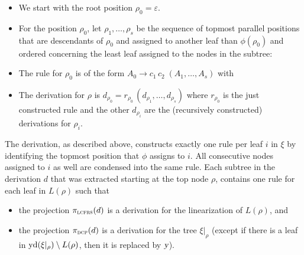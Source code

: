 \documentclass[../../document.tex]{subfiles}
\begin{document}
    \begin{itemize}
        \item We start with the root position \(\rho_0 = \varepsilon\).
        \item For the position \(\rho_0\), let \(\rho_1, \ldots, \rho_s\) be the sequence of topmost parallel positions that are descendants of \(\rho_0\) and assigned to another leaf than \(\phi(\rho_0)\) and ordered concerning the least leaf assigned to the nodes in the subtree:
        \item The rule for \(\rho_0\) is of the form \(A_0 \to c_1 \, c_2\; (A_1, \ldots, A_s)\) with
        \item The derivation for \(\rho\) is \(d_{\rho_0} = r_{\rho_0}\,(d_{\rho_1}, \ldots, d_{\rho_s})\) where \(r_{\rho_0}\) is the just constructed rule and the other \(d_{\rho_i}\) are the (recursively constructed) derivations for \(\rho_i\).
    \end{itemize}

    The derivation, as described above, constructs exactly one rule per leaf \(i\) in \(\xi\) by identifying the topmost position that \(\phi\) assigns to \(i\).
    All consecutive nodes assigned to \(i\) as well are condensed into the same rule.
    Each subtree in the derivation \(d\) that was extracted starting at the top node \(\rho\), contains one rule for each leaf in \(L(\rho)\) such that
    \begin{itemize}
        \item the  projection \(\pi_{\textsc{lcfrs}}(d)\) is a derivation for the linearization of \(L(\rho)\), and
        \item the  projection \(\pi_{\textsc{dcp}}(d)\) is a derivation for the tree \(\xi|_\rho\) (except if there is a leaf in \(\operatorname{yd}(\xi|_\rho) \setminus L(\rho)\), then it is replaced by \(\textsl{y}\)).
    \end{itemize}
\end{document}
